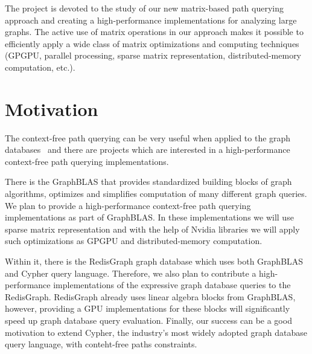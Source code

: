 \documentclass[12pt]{article}  %
\theoremstyle{remark}
\begin{document}
The project is devoted to the study of our new matrix-based path querying approach and creating a high-performance implementations for analyzing large graphs. The active use of matrix operations in our approach makes it possible to efficiently apply a wide class of matrix optimizations and computing techniques (GPGPU, parallel processing, sparse matrix representation, distributed-memory computation, etc.).

\section{Motivation}
The context-free path querying can be very useful when applied to the graph databases~\cite{kuijpers2019experimental} and there are projects which are interested in a high-performance context-free path querying implementations.

There is the GraphBLAS that provides standardized building blocks of graph algorithms, optimizes and simplifies computation of many different graph queries. 
We plan to provide a high-performance context-free path querying implementations as part of GraphBLAS. 
In these implementations we will use sparse matrix representation and with the help of Nvidia libraries we will apply such optimizations as GPGPU and distributed-memory computation.

Within it, there is the RedisGraph graph database which uses both GraphBLAS and Cypher query language. 
Therefore, we also plan to contribute a high-performance implementations of the expressive graph database queries to the RedisGraph. 
RedisGraph already uses linear algebra blocks from GraphBLAS, however, providing a GPU implementations for these blocks will significantly speed up graph database query evaluation.
Finally, our success can be a good motivation to extend Cypher, the industry’s most widely adopted graph database query language, with conteht-free paths constraints. 


\end{document}
